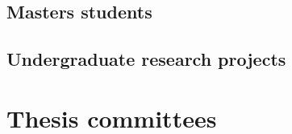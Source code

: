 \documentclass{article}
\newcounter{ecompactctr}
\newenvironment{ecompact}{
  \begin{list}{\arabic{ecompactctr}. }{
    \usecounter{ecompactctr}
    \parsep 0pt plus 1pt
    \partopsep 0pt plus 1pt
    \topsep 2pt plus 2pt minus 1pt
    \itemsep 0pt plus 1pt
    \parskip 0pt plus 2pt
    \leftmargin 0.3in}
       \raggedright}
  {\normalsize\end{list}}
\begin{document}


\subsection*{Masters students}



\subsection*{Undergraduate research projects}




\section*{Thesis committees}





\end{document}
